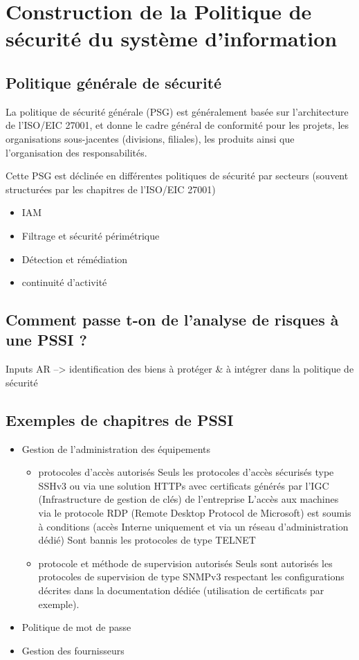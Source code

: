 

\section{Construction de la Politique de sécurité du système d'information}

\subsection{Politique générale de sécurité}

La politique de sécurité générale (PSG) est généralement basée sur l'architecture de l'ISO/EIC 27001, et donne le cadre général de conformité pour les projets, les organisations sous-jacentes (divisions, filiales), les produits ainsi que l'organisation des responsabilités.

Cette PSG est déclinée en différentes politiques de sécurité par secteurs (souvent structurées par les chapitres de l'ISO/EIC 27001)

\begin{itemize}
	\item IAM
	\item Filtrage et sécurité périmétrique
	\item Détection et rémédiation
	\item continuité d'activité
\end{itemize}
	

\subsection{Comment passe t-on de l’analyse de risques à une PSSI ?}

Inputs AR --> identification des biens à protéger \& à intégrer dans la politique de sécurité


\subsection{Exemples de chapitres de PSSI}
\begin{itemize}
    \item Gestion de l’administration des équipements
    \begin{itemize}
        \item protocoles d’accès autorisés
        Seuls les protocoles d'accès sécurisés type SSHv3 ou via une solution HTTPs avec certificats générés par l'IGC (Infrastructure de gestion de clés) de l'entreprise
        L'accès aux machines via le protocole RDP (Remote Desktop Protocol de Microsoft) est soumis à conditions (accès Interne uniquement et via un réseau d'administration dédié)
        Sont bannis les protocoles de type TELNET
        \item protocole et méthode de supervision autorisés
        Seuls sont autorisés les protocoles de supervision de type SNMPv3 respectant les configurations décrites dans la documentation dédiée (utilisation de certificats par exemple).
    \end{itemize}
    \item Politique de mot de passe
    \item Gestion des fournisseurs
\end{itemize}
